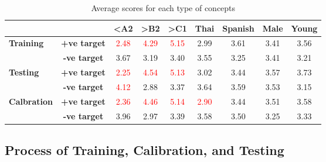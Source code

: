\begin{table}[H]
  \centering
  \begin{tabular}{|lc|c|c|c|c|c|c|c|}
    \hline
    \multicolumn{2}{|l|}{\textbf{}}                            & \textbf{\textless{}A2} & \textbf{\textgreater{}B2} & \textbf{\textgreater{}C1} & \textbf{Thai}         & \textbf{Spanish}      & \textbf{Male} & \textbf{Young}        \\ \hline
    \multicolumn{1}{|l|}{\multirow{2}{*}{\textbf{Training}}}   & \textbf{+ve target}    & \textcolor{red}{2.48}     & \textcolor{red}{4.29}     & \textcolor{red}{5.15} & 2.99                  & 3.61          & 3.41           & 3.56 \\ \cline{2-9}
    \multicolumn{1}{|l|}{}                                     & \textbf{-ve target}    & 3.67                      & 3.19                      & 3.40                  & 3.55                  & 3.25          & 3.41           & 3.21 \\ \hline
    \multicolumn{1}{|l|}{\multirow{2}{*}{\textbf{Testing}}}    & \textbf{+ve target}    & \textcolor{red}{2.25}     & \textcolor{red}{4.54}     & \textcolor{red}{5.13} & 3.02                  & 3.44          & 3.57           & 3.73 \\ \cline{2-9}
    \multicolumn{1}{|l|}{}                                     & \textbf{-ve target}    & \textcolor{red}{4.12}     & 2.88                      & 3.37                  & 3.64                  & 3.59          & 3.53           & 3.15 \\ \hline
    \multicolumn{1}{|l|}{\multirow{2}{*}{\textbf{Calbration}}} & \textbf{+ve target}    & \textcolor{red}{2.36}     & \textcolor{red}{4.46}     & \textcolor{red}{5.14} & \textcolor{red}{2.90} & 3.44          & 3.51           & 3.58 \\ \cline{2-9}
    \multicolumn{1}{|l|}{}                                     & \textbf{-ve target}    & 3.96                      & 2.97                      & 3.39                  & 3.58                  & 3.50          & 3.25           & 3.33 \\ \hline
  \end{tabular}
  \caption{Average scores for each type of concepts}
  \label{tab:avg_scores}
\end{table}

\subsection{Process of Training, Calibration, and Testing}

